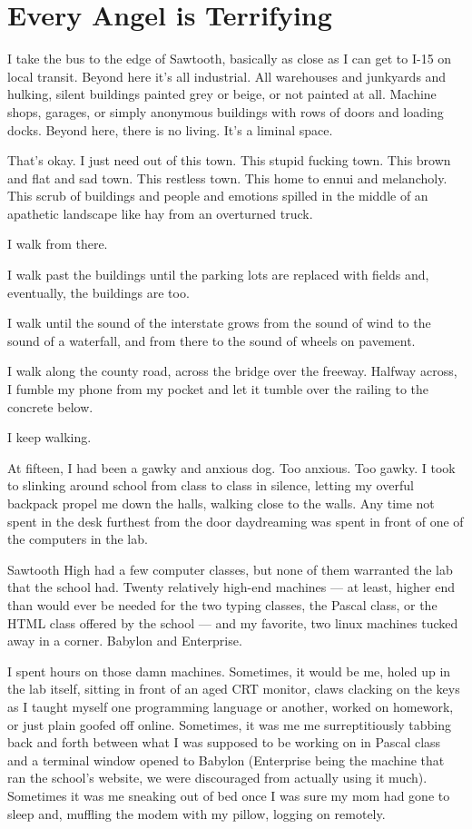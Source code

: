 \hypertarget{every-angel-is-terrifying}{%
\chapter{Every Angel is Terrifying}\label{every-angel-is-terrifying}}

I take the bus to the edge of Sawtooth, basically as close as I can get to I-15 on local transit. Beyond here it's all industrial. All warehouses and junkyards and hulking, silent buildings painted grey or beige, or not painted at all. Machine shops, garages, or simply anonymous buildings with rows of doors and loading docks. Beyond here, there is no living. It's a liminal space.

That's okay. I just need out of this town. This stupid fucking town. This brown and flat and sad town. This restless town. This home to ennui and melancholy. This scrub of buildings and people and emotions spilled in the middle of an apathetic landscape like hay from an overturned truck.

I walk from there.

I walk past the buildings until the parking lots are replaced with fields and, eventually, the buildings are too.

I walk until the sound of the interstate grows from the sound of wind to the sound of a waterfall, and from there to the sound of wheels on pavement.

I walk along the county road, across the bridge over the freeway. Halfway across, I fumble my phone from my pocket and let it tumble over the railing to the concrete below.

I keep walking.

\secdiv{}

\noindent At fifteen, I had been a gawky and anxious dog. Too anxious. Too gawky. I took to slinking around school from class to class in silence, letting my overful backpack propel me down the halls, walking close to the walls. Any time not spent in the desk furthest from the door daydreaming was spent in front of one of the computers in the lab.

Sawtooth High had a few computer classes, but none of them warranted the lab that the school had. Twenty relatively high-end machines --- at least, higher end than would ever be needed for the two typing classes, the Pascal class, or the HTML class offered by the school --- and my favorite, two linux machines tucked away in a corner. Babylon and Enterprise.

I spent hours on those damn machines. Sometimes, it would be me, holed up in the lab itself, sitting in front of an aged CRT monitor, claws clacking on the keys as I taught myself one programming language or another, worked on homework, or just plain goofed off online. Sometimes, it was me me surreptitiously tabbing back and forth between what I was supposed to be working on in Pascal class and a terminal window opened to Babylon (Enterprise being the machine that ran the school's website, we were discouraged from actually using it much). Sometimes it was me sneaking out of bed once I was sure my mom had gone to sleep and, muffling the modem with my pillow, logging on remotely.

